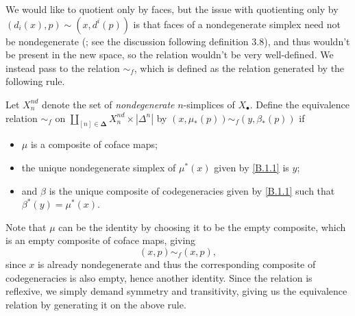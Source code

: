 \begin{remark}\label{B.1.2}
	We would like to quotient only by faces, but the issue with quotienting only by $(d_i(x),p)\sim (x,d^i(p))$ is that faces of a nondegenerate simplex need not be nondegenerate (\cite{fried}; see the discussion following definition 3.8), and thus wouldn't be present in the new space, so the relation wouldn't be very well-defined. We instead pass to the relation $\sim _f$, which is defined as the relation generated by the following rule.

	Let $X^{nd} _n$ denote the set of \emph{nondegenerate} $n$-simplices of $X_{\bullet} $. Define the equivalence relation $\sim _f$ on $\coprod_{[n]\in\boldsymbol{\Delta} } X_n^{nd} \times \left| \Delta^n \right| $ by $(x,\mu_*(p))\sim _f (y,\beta_*(p))$ if
	\begin{itemize}
		\item $\mu$ is a composite of coface maps;
		\item the unique nondegenerate simplex of $\mu^*(x)$ given by \cref{B.1.1} is $y$;
		\item and $\beta$ is the unique composite of codegeneracies given by \cref{B.1.1} such that $\beta^*(y)=\mu^*(x)$.
	\end{itemize}
	Note that $\mu$ can be the identity by choosing it to be the empty composite, which is an empty composite of coface maps, giving
	\[
		(x,p)\sim_f (x,p),
	\]
	since $x$ is already nondegenerate and thus the corresponding composite of codegeneracies is also empty, hence another identity. Since the relation is reflexive, we simply demand symmetry and transitivity, giving us the equivalence relation by generating it on the above rule.
\end{remark}


